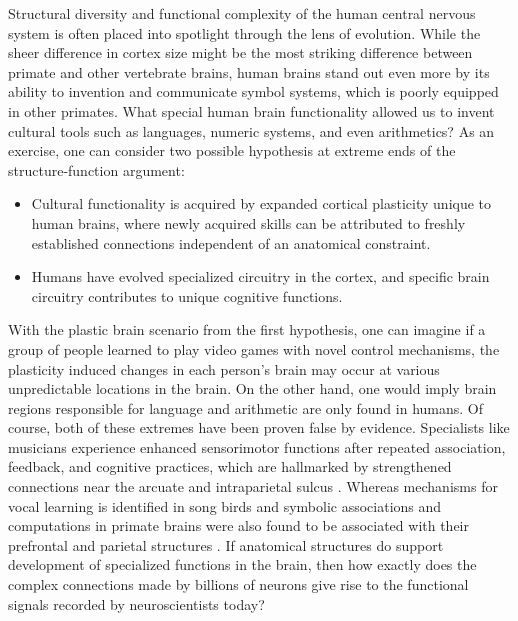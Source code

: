 Structural diversity and functional complexity of the human central nervous system is often placed into spotlight through the lens of evolution. While the sheer difference in cortex size might be the most striking difference between primate and other vertebrate brains, human brains stand out even more by its ability to invention and communicate symbol systems, which is poorly equipped in other primates. What special human brain functionality allowed us to invent cultural tools such as languages, numeric systems, and even arithmetics? As an exercise, one can consider two possible hypothesis at extreme ends of the structure-function argument:

\begin{itemize}
  \item Cultural functionality is acquired by expanded cortical plasticity unique to human brains, where newly acquired skills can be attributed to freshly established connections independent of an anatomical constraint.
  \item Humans have evolved specialized circuitry in the cortex, and specific brain circuitry contributes to unique cognitive functions. 
\end{itemize}

With the plastic brain scenario from  the first hypothesis, one can imagine if a group of people learned to play video games with novel control mechanisms, the plasticity induced changes in each person's brain may occur at various unpredictable locations in the brain. On the other hand, one would imply brain regions responsible for language and arithmetic are only found in humans. Of course, both of these extremes have been proven false by evidence. Specialists like musicians experience enhanced sensorimotor functions after repeated association, feedback, and cognitive practices, which are hallmarked by strengthened connections near the arcuate and intraparietal sulcus \cite{wan_music_2010}. Whereas mechanisms for vocal learning is identified in song birds \cite{warren_mechanisms_2011} and symbolic associations and computations in primate brains were also found to be associated with their prefrontal and parietal structures \cite{nieder_counting_2005,diester_semantic_2007}. If anatomical structures do support development of specialized functions in the brain, then how exactly does the complex connections made by billions of neurons give rise to the functional signals recorded by neuroscientists today? 

